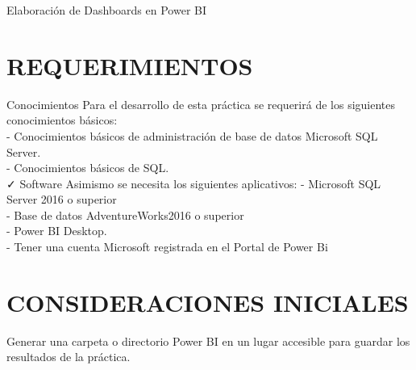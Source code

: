 \item{
Elaboración de Dashboards en Power BI


\section{REQUERIMIENTOS}
\item{Conocimientos
Para el desarrollo de esta práctica se requerirá de los siguientes conocimientos básicos:\\
- Conocimientos básicos de administración de base de datos Microsoft SQL Server.\\
- Conocimientos básicos de SQL.\\
✓ Software
Asimismo se necesita los siguientes aplicativos:
- Microsoft SQL Server 2016 o superior\\
- Base de datos AdventureWorks2016 o superior\\
- Power BI Desktop.\\
- Tener una cuenta Microsoft registrada en el Portal de Power Bi}\\

\section{CONSIDERACIONES INICIALES}
\item{Generar una carpeta o directorio Power BI en un lugar accesible para guardar los resultados de la práctica.}
}
